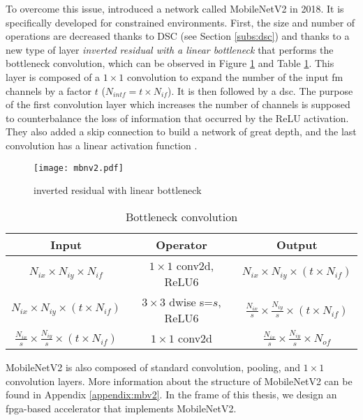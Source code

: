 To overcome this issue, \textcite{sandler_mobilenetv2_2018} introduced a network called MobileNetV2 in 2018. It is specifically developed for constrained environments. First, the size and number of operations are decreased thanks to DSC (see Section \ref{subs:dsc}) and thanks to a new type of layer \textit{inverted residual with a linear bottleneck} that performs the bottleneck convolution, which can be observed in Figure \ref{fig:invreslinbot} and Table \ref{tab:invreslinbot}.
This layer is composed of a $1 \times 1$ convolution to expand the number of the input \acrshort{fm} channels by a factor $t$ ($N_{intf} = t \times N_{if}$). It is then followed by a \acrshort{dsc}. The purpose of the first convolution layer which increases the number of channels is supposed to counterbalance the loss of information that occurred by the ReLU activation. They also added a skip connection to build a network of great depth, and the last convolution has a linear activation function \cite{sandler_mobilenetv2_2018}.

%
\begin{figure}[H]
    \centering
    \texttt{[image: mbnv2.pdf]}
    \caption{inverted residual with linear bottleneck \cite{sandler_mobilenetv2_2018}}
    \label{fig:invreslinbot}
\end{figure}

\begin{table}
    \center
    \begin{tabular}{c|c|c}
        Input & Operator & Output \\
        \hline \hline
        $N_{ix} \times N_{iy} \times N_{if}$ & $1 \times 1$ conv2d, ReLU6 & $N_{ix} \times N_{iy} \times (t \times N_{if})$ \\
        $N_{ix} \times N_{iy} \times (t \times N_{if})$ & $3 \times3$ dwise s=$s$, ReLU6 & $\frac{N_{ix}}{s} \times \frac{N_{iy}}{s} \times (t \times N_{if})$ \\
        $\frac{N_{ix}}{s} \times \frac{N_{iy}}{s} \times (t \times N_{if})$ & $1 \times 1$ conv2d & $\frac{N_{ix}}{s} \times \frac{N_{iy}}{s} \times N_{of}$ \\
        \hline \hline
    \end{tabular}
    \caption{Bottleneck convolution \cite{sandler_mobilenetv2_2018}}
    \label{tab:invreslinbot}
\end{table}

MobileNetV2 is also composed of standard convolution, pooling, and $1 \times 1$ convolution layers. More information about the structure of MobileNetV2 can be found in Appendix \ref{appendix:mbv2}. In the frame of this thesis, we design an \acrshort{fpga}-based accelerator that implements MobileNetV2.
